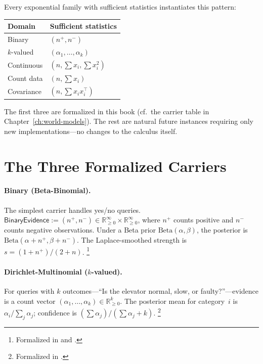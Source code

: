 \documentclass[11pt,openany]{report}
\begin{document}
Every exponential family with sufficient statistics instantiates this
pattern:

\begin{center}
\begin{tabular}{ll}
\toprule
\textbf{Domain} & \textbf{Sufficient statistics} \\
\midrule
Binary       & $(n^+, n^-)$ \\
$k$-valued   & $(\alpha_1, \ldots, \alpha_k)$ \\
Continuous   & $(n, \sum x_i, \sum x_i^2)$ \\
Count data   & $(n, \sum x_i)$ \\
Covariance   & $(n, \sum x_i x_i^\top)$ \\
\bottomrule
\end{tabular}
\end{center}

\noindent
The first three are formalized in this book
(cf.\ the carrier table in Chapter~\ref{ch:world-models}).  The rest
are natural future instances requiring only new 
implementations---no changes to the calculus itself.


\section{The Three Formalized Carriers}

\paragraph{Binary (Beta-Binomial).}
The simplest carrier handles yes/no queries.
$\mathsf{BinaryEvidence} := (n^+, n^-) \in
\mathbb{R}_{\ge 0}^\infty \times \mathbb{R}_{\ge 0}^\infty$,
where $n^+$ counts positive and $n^-$ counts negative observations.
Under a Beta prior $\text{Beta}(\alpha, \beta)$, the posterior is
$\text{Beta}(\alpha + n^+, \beta + n^-)$.  The Laplace-smoothed
strength is $s = (1 + n^+) / (2 + n)$.%
\footnote{Formalized in 
and .}

\paragraph{Dirichlet-Multinomial ($k$-valued).}
For queries with $k$ outcomes---``Is the elevator normal, slow, or
faulty?''---evidence is a count vector
$(\alpha_1, \ldots, \alpha_k) \in \mathbb{R}_{\ge 0}^k$.
The posterior mean for category~$i$ is
$\alpha_i / \sum_j \alpha_j$; confidence is
$(\sum \alpha_j) / (\sum \alpha_j + k)$.%
\footnote{Formalized in .}
\end{document}
